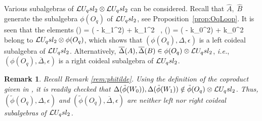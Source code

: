 \documentclass[11pt]{amsart}
\numberwithin{equation}{section}
\newtheorem{rem}[thm]{Remark}
\numberwithin{equation}{section}
\begin{document}
Various subalgebras of $\mathcal{L} U_q sl_2 \otimes \mathcal{L} U_q sl_2$ can be considered. Recall that $\widehat{A},\;\widehat{B}$ generate the subalgebra $\phi(O_q)$ of $\mathcal{L} U_q sl_2$, see Proposition~\ref{prop:OqLoop}. It is seen that the elements 
\beqa
\Delta() = ( - \alpha k_1^2)  + k_1^2 \otimes {} \ ,\qquad
 \Delta() = ( - \beta k_0^2)  + k_0^2 \otimes {} \ \label{eq:DelAB}
\eeqa
 belong to $\mathcal{L} U_q sl_2 \otimes \phi(O_q)$, which  shows that $(\phi(O_q),\Delta,\epsilon)$ is a left coideal subalgebra of $\mathcal{L} U_q sl_2$. Alternatively,  $\overline\Delta(A),\overline\Delta(B)\in \phi(O_q) \otimes\mathcal{L} U_q sl_2$, \textit{i.e.}, $(\phi(O_q),\overline\Delta,\epsilon)$ is a right coideal subalgebra of $\mathcal{L} U_q sl_2$.
 \begin{rem}\label{rem:notcoid} Recall Remark \ref{rem:phitilde}. Using the definition of the coproduct given in \cite[Sec.\,1]{IT10}, it is readily checked that $\Delta(\tilde{\phi}(W_0)),\Delta(\tilde{\phi}(W_1)) \notin \tilde{\phi}(O_q)\otimes \mathcal{L} U_q sl_2$. Thus, $(\tilde\phi(O_q),\Delta,\epsilon)$ and $(\tilde\phi(O_q),\overline\Delta,\epsilon)$ are neither left nor right coideal subalgebras of $\mathcal{L} U_q sl_2$.
 \end{rem}
 
\end{document}
